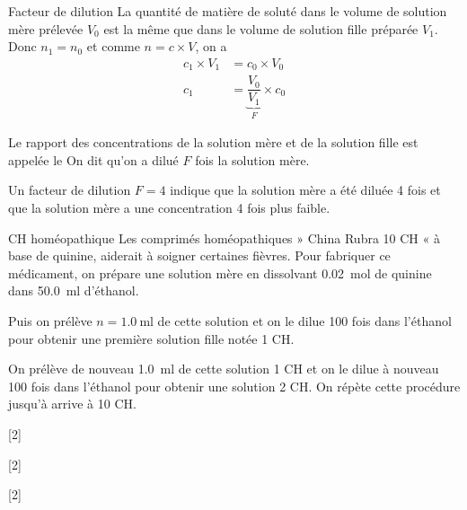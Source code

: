 \begin{doc}{Facteur de dilution}
  La quantité de matière de soluté dans le volume de solution mère prélevée $V_0$ est la même que dans le volume de solution fille préparée $V_1$. Donc $n_1 = n_0$ et comme $n = c \times V$, on a
  \begin{align*}
    c_1 \times V_1 &= c_0 \times V_0 \\
    c_1 &= \underbrace{\dfrac{V_0}{V_1}}_{F} \times c_0
  \end{align*}

  \begin{importants}  
    Le rapport des concentrations de la solution mère et de la solution fille est appelée le 
    On dit qu'on a dilué $F$ fois la solution mère.
  \end{importants}
  \exemple Un facteur de dilution $F = 4$ indique que la solution mère a été diluée 4 fois et que la solution mère a une concentration 4 fois plus faible.
\end{doc}

\begin{doc}{CH homéopathique}
  Les comprimés homéopathiques » China Rubra 10 CH « à base de quinine, aiderait à soigner certaines fièvres.
  Pour fabriquer ce médicament, on prépare une solution mère en dissolvant \qty{0,02}{\mole} de quinine %
  dans \qty{50,0}{\ml} d’éthanol.
  
  Puis on prélève $n = \qty{1,0}{\ml}$ de cette solution et on le dilue 100 fois dans l’éthanol pour obtenir une première solution fille notée 1 CH.
  
  On prélève de nouveau \qty{1,0}{\ml} de cette solution 1 CH et on le dilue à nouveau 100 fois dans l'éthanol pour obtenir une solution 2 CH.
  On répète cette procédure jusqu'à arrive à 10 CH.
\end{doc}

[2]

[2]

[2]
